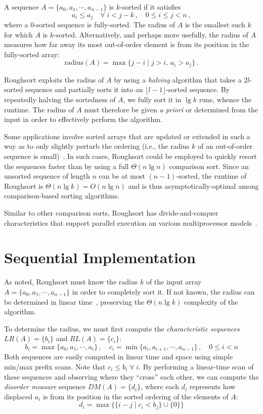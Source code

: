 \documentclass[letterpaper, 12pt]{article}
\let\supercite\cite
\renewcommand{\cite}[1]{\textnormal{~\supercite{#1}}}
\begin{document}
A sequence $A = \{a_0, a_1, \cdots, a_{n-1}\}$ is $k$-sorted if it satisfies
$$a_i \leq a_j \quad\forall\; i < j - k \,,\quad 0 \leq i \leq j < n\,,$$
where a 0-sorted sequence is fully-sorted.
The radius of $A$ is the smallest such $k$ for which $A$ is $k$-sorted.
Alternatively, and perhaps more usefully, the radius of $A$ measures how far away its most out-of-order element is from its
  position in the fully-sorted array:
$$\text{radius}(A) = \max\{j - i \mid j > i,\, a_i > a_j \} \,.$$

Roughsort exploits the radius of $A$ by using a \textit{halving} algorithm that takes a $2l$-sorted sequence and partially
  sorts it into an $\lfloor l - 1 \rfloor$-sorted sequence.
By repeatedly halving the sortedness of $A$, we fully sort it in $\lg k$ runs, whence the runtime.
The radius of $A$ must therefore be given \textit{a priori} or determined from the input
  in order to effectively perform the algorithm.

Some applications involve sorted arrays that are updated or extended in such a way as to only slightly perturb the ordering
  (i.e., the radius $k$ of an out-of-order sequence is small)\cite{altman89}.
In such cases, Roughsort could be employed to quickly resort the sequences faster than by using a full $\Theta(n \lg n)$
  comparison sort.
Since an unsorted sequence of length $n$ can be at most $(n - 1)$-sorted, the runtime of Roughsort is
  $\Theta(n \lg k) = O(n \lg n)$ and is thus asymptotically-optimal among comparison-based sorting algorithms.

Similar to other comparison sorts, Roughsort has divide-and-conquer characteristics that support parallel execution on various
  multiprocessor models\cite{altman89, altman90}.

\section{Sequential Implementation}
As noted, Roughsort must know the radius $k$ of the input array $A = \{a_0, a_1, \cdots, a_{n-1}\}$
  in order to completely sort it.
If not known, the radius can be determined in linear time\cite{altman89}, preserving the $\Theta(n \lg k)$ complexity of the
  algorithm.

To determine the radius, we must first compute the \textit{characteristic sequences} $LR(A) = \{b_i\}$ and $RL(A) = \{c_i\}$:
$$b_i = \max\{a_0, a_1, \cdots, a_i\}\,, \quad c_i = \min\{a_i, a_{i+1}, \cdots, a_{n-1}\}\,, \quad 0 \leq i < n$$
Both sequences are easily computed in linear time and space using simple min/max prefix scans.
Note that $c_i \leq b_i \;\forall\; i$.
By performing a linear-time scan of these sequences and observing where they ``cross'' each other, we can compute
  the \textit{disorder measure} sequence $DM(A) = \{d_i\}$, where each $d_i$ represents how displaced $a_i$ is from its position
  in the sorted ordering of the elements of $A$:
$$d_i = \max\big\{\{i - j \mid c_i < b_j\} \cup \{0\} \big\}$$
\end{document}
